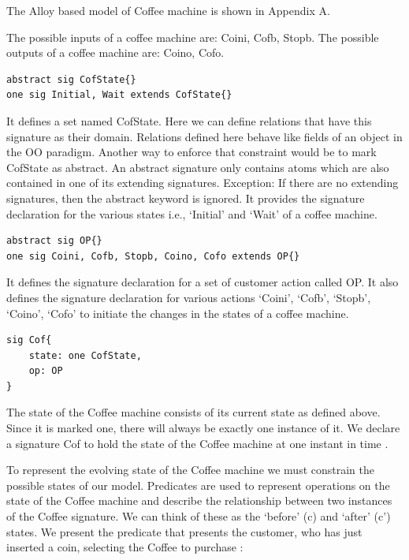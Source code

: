 \documentclass[a4paper,12pt]{report}
\begin{document}
 The Alloy based model of Coffee machine is shown in Appendix A.
 
The possible inputs of a coffee machine are: Coini, Cofb, Stopb. The possible outputs of a coffee machine are: Coino, Cofo.

\begin{verbatim}
abstract sig CofState{}
one sig Initial, Wait extends CofState{}
\end{verbatim}

It defines a set named CofState. Here we can define relations that have this signature as their domain. Relations defined here behave like fields of an object in the OO paradigm. Another way to enforce that constraint would be to mark CofState as abstract. An abstract signature only contains atoms which are also contained in one of its extending signatures. Exception: If there are no extending signatures, then the abstract keyword is ignored. It provides the signature declaration for the various states i.e., `Initial' and `Wait' of a coffee machine. 

\begin{verbatim}
abstract sig OP{}
one sig Coini, Cofb, Stopb, Coino, Cofo extends OP{}
\end{verbatim}

It defines the signature declaration for a set of customer action called OP. It also defines the signature declaration for various actions `Coini', `Cofb', `Stopb', `Coino', `Cofo' to initiate the changes in the states of a coffee machine.

\begin{verbatim}
sig Cof{
	state: one CofState,
	op: OP
}
\end{verbatim}

The state of the Coffee machine consists of its current state as defined above. Since it is marked one, there will always be exactly one instance of it. We declare a signature Cof to hold the state of the Coffee machine at one instant in time \cite{RussellBoyatt}.

To represent the evolving state of the Coffee machine we must constrain the possible states of our model. Predicates are used to represent operations on the state of the Coffee machine and describe the relationship between two instances of the Coffee signature. We can think of these as the `before' (c) and `after' (c') states. We present the predicate that presents the customer, who has just inserted a coin, selecting the Coffee to purchase \cite{RussellBoyatt}:
\end{document}
